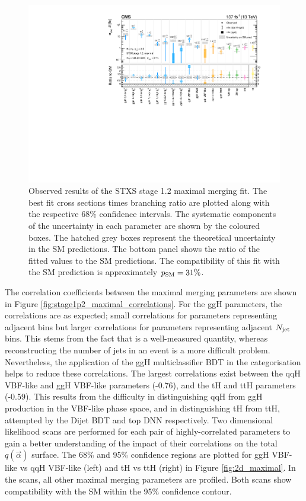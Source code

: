 \begin{figure}[htbp]
  \centering
  \includegraphics[width=1\textwidth]{Figures/hgg_results/stage1p2_maximal_summary.pdf}
  \caption[Results of the STXS stage 1.2 maximal merging fit]
  {
    Observed results of the STXS stage 1.2 maximal merging fit. The best fit cross sections times branching ratio are plotted along with the respective 68\% confidence intervals. The systematic components of the uncertainty in each parameter are shown by the coloured boxes. The hatched grey boxes represent the theoretical uncertainty in the SM predictions. The bottom panel shows the ratio of the fitted values to the SM predictions. The compatibility of this fit with the SM prediction is approximately $p_{\rm{SM}}=31\%$. 
  }
  \label{fig:stage1p2_maximal_results}
\end{figure}

The correlation coefficients between the maximal merging parameters are shown in Figure \ref{fig:stage1p2_maximal_correlations}. For the ggH parameters, the correlations are as expected; small correlations for parameters representing adjacent \ptH bins but larger correlations for parameters representing adjacent $N_{\rm{jet}}$ bins. This stems from the fact that \ptgg is a well-measured quantity, whereas reconstructing the number of jets in an event is a more difficult problem. Nevertheless, the application of the ggH multiclassifier BDT in the categorisation helps to reduce these correlations. The largest correlations exist between the qqH VBF-like and ggH VBF-like parameters (-0.76), and the tH and ttH parameters (-0.59). This results from the difficulty in distinguishing qqH from ggH production in the VBF-like phase space, and in distinguishing tH from ttH, attempted by the Dijet BDT and top DNN respectively. Two dimensional likelihood scans are performed for each pair of highly-correlated parameters to gain a better understanding of the impact of their correlations on the total $q(\vec{\alpha})$ surface. The 68\% and 95\% confidence regions are plotted for ggH VBF-like vs qqH VBF-like (left) and tH vs ttH (right) in Figure \ref{fig:2d_maximal}. In the scans, all other maximal merging parameters are profiled. Both scans show compatibility with the SM within the 95\% confidence contour.

